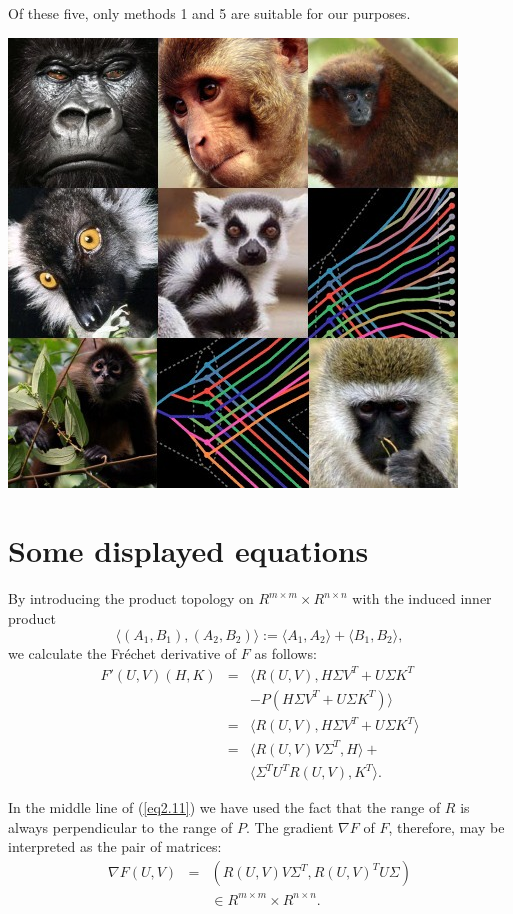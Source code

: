 \documentclass[myposter,portrait]{sciposter}
\def\mysection#1{
{\color{sectionCol}\section*{\sc\bfseries #1}}}
\begin{document}
\begin{multicols*}{3}
Of these five, only methods 1 and 5 are suitable for our purposes.

\includegraphics[width=\columnwidth]{images/allmonkeys}



\mysection{Some displayed equations}
     By introducing the product topology on  $R^{m \times m} \times
R^{n \times n}$  with the induced inner product
\begin{equation}
\langle (A_{1},B_{1}), (A_{2},B_{2})\rangle := \langle A_{1},A_{2}\rangle 
+ \langle B_{1},B_{2}\rangle,\label{eq2.10}
\end{equation}
we calculate the Fr\'{e}chet derivative of  $F$  as follows:
\begin{eqnarray}
 F'(U,V)(H,K) &=& \langle R(U,V),H\Sigma V^{T} + U\Sigma K^{T}\nonumber\\
             && - P(H\Sigma V^{T} + U\Sigma K^{T})\rangle \nonumber \\
         &=& \langle R(U,V),H\Sigma V^{T} + U\Sigma K^{T}\rangle\nonumber \\
&=& \langle R(U,V)V\Sigma^{T},H\rangle + \nonumber\\
  &&    \langle \Sigma^{T}U^{T}R(U,V),K^{T}\rangle.    \label{eq2.11}
\end{eqnarray}

In the middle line of (\ref{eq2.11}) we have used the fact that the range of
$R$ is always perpendicular to the range of $P$.  The gradient $\nabla F$  of
$F$, therefore,  may be interpreted as the
pair of matrices:
\begin{eqnarray}
 \nabla F(U,V) &=& (R(U,V)V\Sigma^{T},R(U,V)^{T}U\Sigma )\nonumber\\
 && \in R^{m \times m} \times R^{n \times n}.   \label{eq2.12}
\end{eqnarray}


\end{multicols*}
\end{document}
